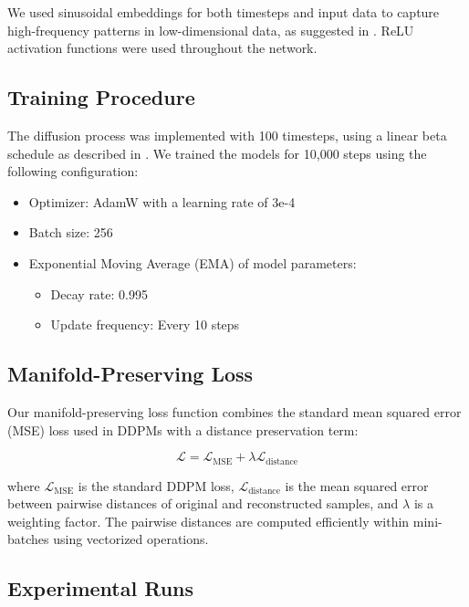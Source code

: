 \documentclass{article} %
\begin{document}
We used sinusoidal embeddings for both timesteps and input data to capture high-frequency patterns in low-dimensional data, as suggested in \cite{ddpm}. ReLU activation functions were used throughout the network.

\subsection{Training Procedure}

The diffusion process was implemented with 100 timesteps, using a linear beta schedule as described in \cite{ddpm}. We trained the models for 10,000 steps using the following configuration:

\begin{itemize}
    \item Optimizer: AdamW with a learning rate of 3e-4
    \item Batch size: 256
    \item Exponential Moving Average (EMA) of model parameters:
        \begin{itemize}
            \item Decay rate: 0.995
            \item Update frequency: Every 10 steps
        \end{itemize}
\end{itemize}

\subsection{Manifold-Preserving Loss}

Our manifold-preserving loss function combines the standard mean squared error (MSE) loss used in DDPMs with a distance preservation term:

\begin{equation}
\mathcal{L} = \mathcal{L}_\text{MSE} + \lambda \mathcal{L}_\text{distance}
\end{equation}

where $\mathcal{L}_\text{MSE}$ is the standard DDPM loss, $\mathcal{L}_\text{distance}$ is the mean squared error between pairwise distances of original and reconstructed samples, and $\lambda$ is a weighting factor. The pairwise distances are computed efficiently within mini-batches using vectorized operations.

\subsection{Experimental Runs}
\end{document}
